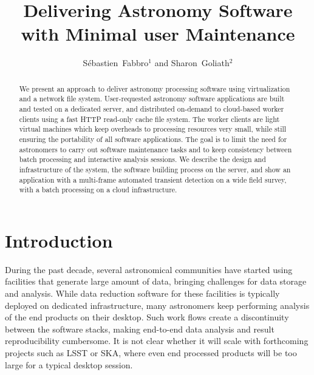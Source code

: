 
\resetcounters




\title{Delivering Astronomy Software with Minimal user Maintenance}

\author{S\'ebastien~Fabbro$^1$ and Sharon~Goliath$^2$
}


\begin{abstract}
  We present an approach to deliver astronomy processing software using
  virtualization and a network file system. User-requested astronomy
  software applications are built and tested on a dedicated server, and
  distributed on-demand to cloud-based worker clients using a fast HTTP
  read-only cache file system. The worker clients are light virtual
  machines which keep overheads to processing resources very small,
  while still ensuring the portability of all software applications. The
  goal is to limit the need for astronomers to carry out software
  maintenance tasks and to keep consistency between batch processing
  and interactive analysis sessions. We describe the design and
  infrastructure of the system, the software building process on the
  server, and show an application with a multi-frame automated
  transient detection on a wide field survey, with a batch processing
  on a cloud infrastructure.
\end{abstract}

\section{Introduction}
During the past decade, several astronomical communities have started using
facilities that generate large amount of data, bringing challenges for
data storage and analysis. While data reduction
software for these facilities is typically deployed on dedicated
infrastructure, many astronomers keep performing analysis of the 
end products on their desktop. Such work flows create a discontinuity between the
software stacks, making end-to-end data analysis and result
reproducibility cumbersome. It is not clear whether it will scale
with forthcoming projects such as LSST or SKA, where even end
processed products will be too large for a typical desktop session.

